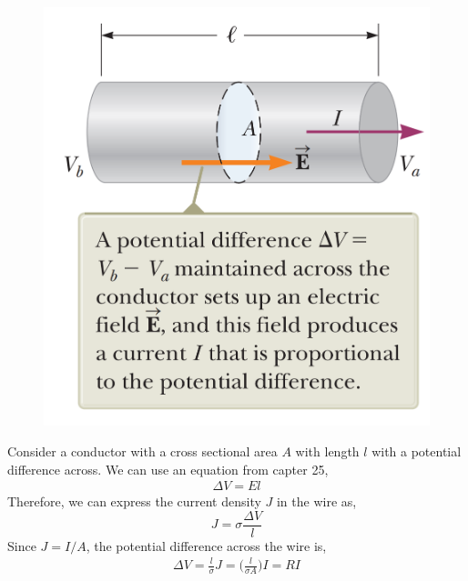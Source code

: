 \documentclass[12pt, titlepage, oneside]{article}
\begin{document}
\begin{figure}
	\begin{center}\vspace{-1.1cm}
		\includegraphics[scale=0.4]{4.png}
	\end{center}
\end{figure}
Consider a conductor with a cross sectional area $A$ with length $l$ with a potential difference across. We can use an equation from capter 25,
\begin{align*}
\Delta V = E l
\end{align*}
Therefore, we can express the current density $J$ in the wire as,
\begin{equation*}
J = \sigma \frac{\Delta V}{l}
\end{equation*}
Since $J = I/A$, the potential difference across the wire is,
\begin{align*}
\Delta V = \frac{l}{\sigma}J = \Bigg(\frac{l}{\sigma A}\Bigg)I = R I 
\end{align*}

\noindent{}
\\
\end{document}
